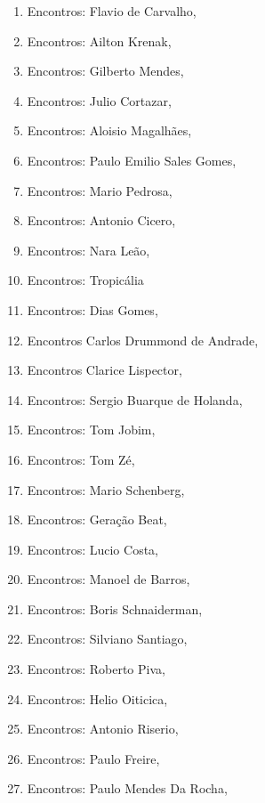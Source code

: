\begin{multicols}{2}
\begin{enumerate}
\item Encontros: Flavio de Carvalho, {}
\item Encontros: Ailton Krenak, {}
\item Encontros: Gilberto Mendes, {}
\item Encontros: Julio Cortazar, {}
\item Encontros: Aloisio Magalhães, {}
\item Encontros: Paulo Emilio Sales Gomes, {}
\item Encontros: Mario Pedrosa, {}
\item Encontros: Antonio Cicero, {}
\item Encontros: Nara Leão, {}
\item Encontros: Tropicália
\item Encontros: Dias Gomes, {}
\item Encontros Carlos Drummond de Andrade, {}
\item Encontros Clarice Lispector, {}
\item Encontros: Sergio Buarque de Holanda, {}
\item Encontros: Tom Jobim, {}
\item Encontros: Tom Zé, {}
\item Encontros: Mario Schenberg, {}
\item Encontros: Geração Beat, {}
\item Encontros: Lucio Costa, {}
\item Encontros: Manoel de Barros, {}
\item Encontros: Boris Schnaiderman, {}
\item Encontros: Silviano Santiago, {}
\item Encontros: Roberto Piva, {}
\item Encontros: Helio Oiticica, {}
\item Encontros: Antonio Riserio, {}
\item Encontros: Paulo Freire, {}
\item Encontros: Paulo Mendes Da Rocha, {}
\end{enumerate}
\end{multicols}

\pagebreak

